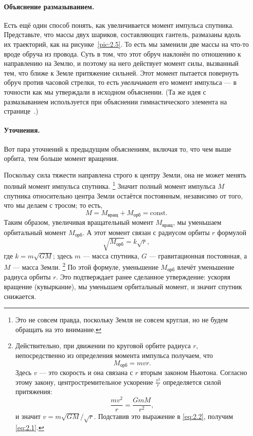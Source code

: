 \paragraph{Объяснение размазыванием.}
Есть ещё один способ понять, как увеличивается момент импульса спутника.
Представьте, что массы двух шариков, составляющих гантель, размазаны вдоль их траекторий,
как на рисунке~\ref{pic:2.5}.
То есть мы заменили две массы на что-то вроде обруча из провода.
Суть в том, что этот обруч наклонён по отношению к направлению на Землю, и поэтому на него действует момент  силы, вызванный тем, что ближе к Земле притяжение сильней.
Этот момент пытается повернуть обруч против часовой стрелки,
то есть \emph{увеличивает} его момент импульса --- в точности как мы утверждали в исходном объяснении.
(Та же идея с размазыванием используется при объяснении гимнастического элемента на странице~\pageref{Большие обороты на перекладине}.)

\paragraph{Уточнения.}
Вот пара уточнений к предыдущим объяснениям, включая то, что чем выше орбита, тем больше момент вращения.

Поскольку сила тяжести направлена строго к центру Земли, она не может менять полный момент импульса спутника.%
\footnote{Это не совсем правда, поскольку Земля не совсем круглая, но не будем обращать на это внимание.}
Значит полный момент импульса $M$ спутника относительно центра Земли остаётся постоянным, независимо от того, что мы делаем с тросом; то есть,
\[
M=M_{\text{вращ}}+M_{\text{орб}}=\mathrm{const}.
\]
Таким образом, увеличивая вращательный момент $M_{\text{вращ}}$, мы уменьшаем орбитальный момент $M_{\text{орб}}$.
А этот момент связан с радиусом орбиты $r$ формулой
\begin{equation}
\sqrt{M_{\text{орб}}}=k \sqrt{r},
\label{eq:2.1}
\end{equation}
где $k=m \sqrt{G M}$;
здесь $m$ --- масса спутника, $G$ --- гравитационная постоянная, а $M$ --- масса Земли.%
\footnote{Действительно, при движении по круговой орбите радиуса $r$, непосредственно из определения момента импульса получаем, что
\begin{equation}
M_{\text{орб}}=m v r. \label{eq:2.2}
\end{equation}
Здесь $v$ --- это скорость и она связана с $r$ вторым законом Ньютона.
Согласно этому закону, центростремительное ускорение $\frac{v^2}{r}$ определяется силой притяжения:
\[
\frac{m  v^2}{r}=\frac{G m M}{r^2},
\]
и значит
$v=m  \sqrt{G M}/\sqrt{r}$.
Подставив это выражение в \eqref{eq:2.2}, получим \eqref{eq:2.1}.}
По этой формуле, уменьшение $M_{\text{орб}}$ влечёт уменьшение радиуса орбиты $r$.
Это подтверждает ранее сделанное утверждение: ускоряя вращение (кувыркание), мы уменьшаем орбитальный момент, и значит спутник снижается.

